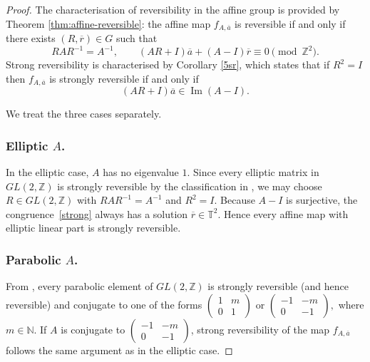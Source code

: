 \documentclass[12pt]{amsart}
\theoremstyle{plain}
\theoremstyle{definition}
\theoremstyle{remark}
\begin{document}
\begin{proof}
The characterisation of reversibility in the affine group is provided by
Theorem \ref{thm:affine-reversible}: the affine map $f_{A,\overline{a}}$ is reversible if and only if there exists
$(R,\overline{r})\in G$ such that
\begin{equation}\label{eq:affrev}
RAR^{-1}=A^{-1}, \qquad (AR+I)\overline{a}+(A-I)\overline{r}\equiv 0 \pmod{\mathbb Z^2}.
\end{equation}
Strong reversibility is characterised by Corollary \ref{5sr}, which states that if
$R^2=I$ then $f_{A,\overline{a}}$ is strongly reversible if and only if
\begin{equation}\label{strong}
(AR+I)\overline{a}\in \operatorname{Im}(A-I).
\end{equation}

We treat the three cases separately.

\subsubsection*{\textbf{Elliptic $A$}.}
In the elliptic case, $A$ has no eigenvalue $1$.
Since every elliptic matrix in $GL(2,\mathbb Z)$ is strongly reversible by the classification in \cite{IS}, we may choose $R\in GL(2,\mathbb Z)$ with $RAR^{-1}=A^{-1}$ and $R^2=I$.
Because $A-I$ is surjective, the congruence~\eqref{strong} always has a
solution $\overline{r}\in\mathbb T^2$.  
Hence every affine map with elliptic linear part is strongly reversible.

\subsubsection*{\textbf{Parabolic $A$}.}
From \cite{IS}, every parabolic element of $GL(2,\mathbb Z)$ is strongly reversible (and hence reversible) and conjugate to one of the forms $\begin{pmatrix}
1 & m\\
0 & 1
\end{pmatrix}$ or $\begin{pmatrix}
-1 & -m\\
0 & -1
\end{pmatrix},$ where $m\in\mathbb{N}.$ If $A$ is conjugate to $\begin{pmatrix}
-1 & -m\\
0 & -1
\end{pmatrix}$, strong reversibility of the map $f_{A,\overline{a}}$ follows the same argument as in the elliptic case.


\end{proof}
\end{document}
